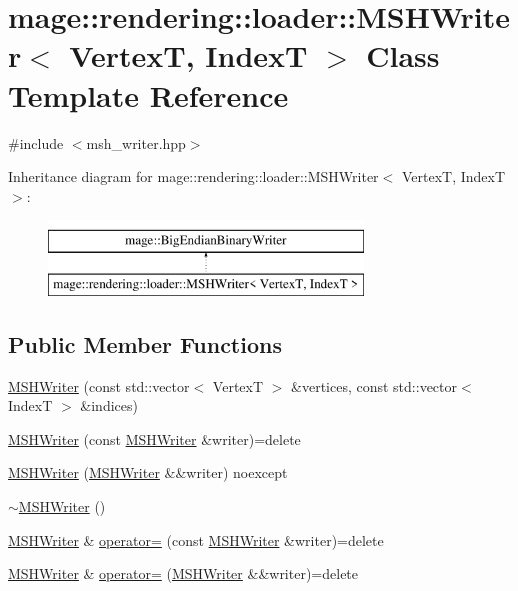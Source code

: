 \hypertarget{classmage_1_1rendering_1_1loader_1_1_m_s_h_writer}{}\section{mage\+:\+:rendering\+:\+:loader\+:\+:M\+S\+H\+Writer$<$ VertexT, IndexT $>$ Class Template Reference}
\label{classmage_1_1rendering_1_1loader_1_1_m_s_h_writer}


{\ttfamily \#include $<$msh\+\_\+writer.\+hpp$>$}

Inheritance diagram for mage\+:\+:rendering\+:\+:loader\+:\+:M\+S\+H\+Writer$<$ VertexT, IndexT $>$\+:\begin{figure}[H]
\begin{center}
\leavevmode
\includegraphics[height=2.000000cm]{classmage_1_1rendering_1_1loader_1_1_m_s_h_writer}
\end{center}
\end{figure}
\subsection*{Public Member Functions}
\begin{DoxyCompactItemize}
\item 
\hyperlink{classmage_1_1rendering_1_1loader_1_1_m_s_h_writer_a5e1a7ed8ca94f157f52bba929cac2fd3}{M\+S\+H\+Writer} (const std\+::vector$<$ VertexT $>$ \&vertices, const std\+::vector$<$ IndexT $>$ \&indices)
\item 
\hyperlink{classmage_1_1rendering_1_1loader_1_1_m_s_h_writer_ade94bfa4dc8b4bdc2249cd882f2240e4}{M\+S\+H\+Writer} (const \hyperlink{classmage_1_1rendering_1_1loader_1_1_m_s_h_writer}{M\+S\+H\+Writer} \&writer)=delete
\item 
\hyperlink{classmage_1_1rendering_1_1loader_1_1_m_s_h_writer_a877a042ef1a4472c9d1cece846b2a70a}{M\+S\+H\+Writer} (\hyperlink{classmage_1_1rendering_1_1loader_1_1_m_s_h_writer}{M\+S\+H\+Writer} \&\&writer) noexcept
\item 
\hyperlink{classmage_1_1rendering_1_1loader_1_1_m_s_h_writer_ae2ead8892a1818c59d55a7a5ecdf50b3}{$\sim$\+M\+S\+H\+Writer} ()
\item 
\hyperlink{classmage_1_1rendering_1_1loader_1_1_m_s_h_writer}{M\+S\+H\+Writer} \& \hyperlink{classmage_1_1rendering_1_1loader_1_1_m_s_h_writer_a661eaab96539a7bf08f100095603af0e}{operator=} (const \hyperlink{classmage_1_1rendering_1_1loader_1_1_m_s_h_writer}{M\+S\+H\+Writer} \&writer)=delete
\item 
\hyperlink{classmage_1_1rendering_1_1loader_1_1_m_s_h_writer}{M\+S\+H\+Writer} \& \hyperlink{classmage_1_1rendering_1_1loader_1_1_m_s_h_writer_a98bdde59fa1a7a6398453f0c7bc4e8dd}{operator=} (\hyperlink{classmage_1_1rendering_1_1loader_1_1_m_s_h_writer}{M\+S\+H\+Writer} \&\&writer)=delete
\end{DoxyCompactItemize}
